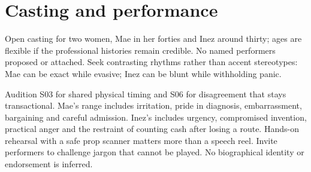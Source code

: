 \section{Casting and performance}
Open casting for two women, Mae in her forties and Inez around thirty; ages are flexible if the professional histories remain credible. No named performers proposed or attached. Seek contrasting rhythms rather than accent stereotypes: Mae can be exact while evasive; Inez can be blunt while withholding panic.

Audition S03 for shared physical timing and S06 for disagreement that stays transactional. Mae's range includes irritation, pride in diagnosis, embarrassment, bargaining and careful admission. Inez's includes urgency, compromised invention, practical anger and the restraint of counting cash after losing a route. Hands-on rehearsal with a safe prop scanner matters more than a speech reel. Invite performers to challenge jargon that cannot be played. No biographical identity or endorsement is inferred.
